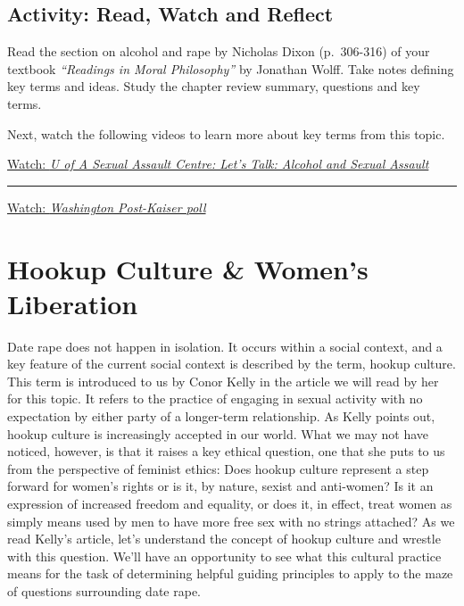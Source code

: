 \documentclass[
]{book}
\begin{document}
\hypertarget{activity-read-watch-and-reflect-8}{%
\subsection*{Activity: Read, Watch and Reflect}\label{activity-read-watch-and-reflect-8}}

\begin{reflect}
Read the section on alcohol and rape by Nicholas Dixon (p.~306-316) of your textbook \emph{``Readings in Moral Philosophy''} by Jonathan Wolff. Take notes defining key terms and ideas. Study the chapter review summary, questions and key terms.

Next, watch the following videos to learn more about key terms from this topic.

\href{https://www.youtube.com/watch?v=kU_TVp6_slw}{Watch: \emph{U of A Sexual Assault Centre: Let's Talk: Alcohol and Sexual Assault}}

\begin{center}\rule{0.5\linewidth}{0.5pt}\end{center}

\href{https://www.washingtonpost.com/video/national/college-students-define-sexual-consent/2015/06/12/2c06cd5e-114a-11e5-a0fe-dccfea4653ee_video.html}{Watch: \emph{Washington Post-Kaiser poll}}
\end{reflect}

\hypertarget{hookup-culture-womens-liberation}{%
\section{Hookup Culture \& Women's Liberation}\label{hookup-culture-womens-liberation}}

Date rape does not happen in isolation. It occurs within a social context, and a key feature of the current social context is described by the term, hookup culture. This term is introduced to us by Conor Kelly in the article we will read by her for this topic. It refers to the practice of engaging in sexual activity with no expectation by either party of a longer-term relationship. As Kelly points out, hookup culture is increasingly accepted in our world. What we may not have noticed, however, is that it raises a key ethical question, one that she puts to us from the perspective of feminist ethics: Does hookup culture represent a step forward for women's rights or is it, by nature, sexist and anti-women? Is it an expression of increased freedom and equality, or does it, in effect, treat women as simply means used by men to have more free sex with no strings attached? As we read Kelly's article, let's understand the concept of hookup culture and wrestle with this question. We'll have an opportunity to see what this cultural practice means for the task of determining helpful guiding principles to apply to the maze of questions surrounding date rape.
\end{document}
